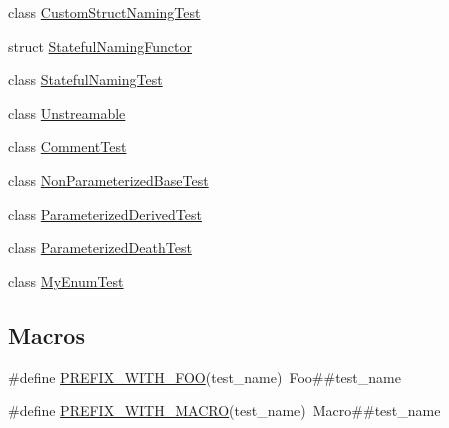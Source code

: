 \begin{DoxyCompactItemize}
class \mbox{\hyperlink{class_custom_struct_naming_test}{Custom\+Struct\+Naming\+Test}}
\item 
struct \mbox{\hyperlink{struct_stateful_naming_functor}{Stateful\+Naming\+Functor}}
\item 
class \mbox{\hyperlink{class_stateful_naming_test}{Stateful\+Naming\+Test}}
\item 
class \mbox{\hyperlink{class_unstreamable}{Unstreamable}}
\item 
class \mbox{\hyperlink{class_comment_test}{Comment\+Test}}
\item 
class \mbox{\hyperlink{class_non_parameterized_base_test}{Non\+Parameterized\+Base\+Test}}
\item 
class \mbox{\hyperlink{class_parameterized_derived_test}{Parameterized\+Derived\+Test}}
\item 
class \mbox{\hyperlink{class_parameterized_death_test}{Parameterized\+Death\+Test}}
\item 
class \mbox{\hyperlink{class_my_enum_test}{My\+Enum\+Test}}
\end{DoxyCompactItemize}
\subsection*{Macros}
\begin{DoxyCompactItemize}
\item 
\#define \mbox{\hyperlink{googletest-master_2googletest_2test_2googletest-param-test-test_8cc_a6414de581a925e7399b27c14e38f8a67}{P\+R\+E\+F\+I\+X\+\_\+\+W\+I\+T\+H\+\_\+\+F\+OO}}(test\+\_\+name)~Foo\#\#test\+\_\+name
\item 
\#define \mbox{\hyperlink{googletest-master_2googletest_2test_2googletest-param-test-test_8cc_aeb9b224f65fb5b0b8f2323a6903d6a68}{P\+R\+E\+F\+I\+X\+\_\+\+W\+I\+T\+H\+\_\+\+M\+A\+C\+RO}}(test\+\_\+name)~Macro\#\#test\+\_\+name
\end{DoxyCompactItemize}
